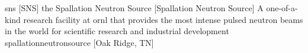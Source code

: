 \newglsXinstitution%
{sns}%
[SNS]%
{the Spallation Neutron Source}%
[Spallation Neutron Source]%
{A one-of-a-kind research facility at \gls{ornl} that provides the most intense pulsed neutron beams in the world for scientific research and industrial development \cite{website:Spallation_Neutron_Source}}%
{spallationneutronsource}%
[Oak Ridge, TN]%